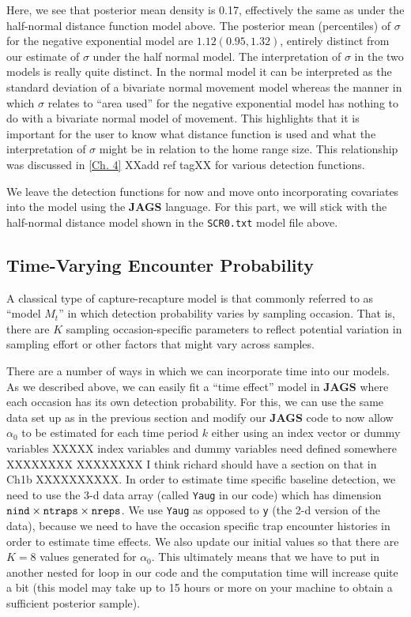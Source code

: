 Here, we see that posterior mean density is 0.17,
effectively the same as under the half-normal distance function model
above.  The posterior mean (percentiles) of $\sigma$ for the negative
exponential model are $1.12 (0.95, 1.32)$, entirely distinct from our
estimate of $\sigma$ under the half normal model. The interpretation
of $\sigma$ in the two models is really quite distinct. In the normal
model it can be interpreted as the standard deviation of a bivariate
normal movement model whereas the manner in which $\sigma$ relates to
``area used'' for the negative exponential model has nothing to do
with a bivariate normal model of movement.  This highlights that it is
important for the user to know what distance function is used and what
the interpretation of $\sigma$ might be in relation to the home range size.
This relationship was discussed in \ref{Ch. 4}
XXadd ref tagXX for various detection functions.


We leave the detection functions for now and move onto incorporating
covariates into the model using the {\bf JAGS}
language.  For this part, we will stick with the half-normal distance
model shown in the \mbox{\tt SCR0.txt} model file above.

\subsection{Time-Varying Encounter Probability}

A classical type of capture-recapture model is that commonly referred
to as ``model $M_{t}$'' \citep{otis_etal:1978} in which detection probability varies by
sampling occasion. That is, there are $K$ sampling occasion-specific
parameters to reflect potential variation in sampling effort or other
factors that might vary across samples.

There are a number of ways in which we can incorporate time into our
models.  As we described above, we can easily fit a ``time effect'' model in {\bf JAGS}
where each occasion has its own detection probability.
For this, we can use the same data set up as in the previous
section and modify our {\bf JAGS} code to now allow $\alpha_0$ to be
estimated for each time period $k$ either using an index vector or
dummy variables XXXXX index variables and dummy variables need defined
somewhere XXXXXXXX XXXXXXXX I think richard should have a section on that in Ch1b XXXXXXXXXX.  In order to estimate time
specific baseline detection, we need to use the 3-d data array (called \mbox{\tt Yaug} in our
code) which
has dimension
$\mbox{\tt nind} \times \mbox{\tt ntraps} \times \mbox{\tt nreps}$.
We use \mbox{\tt Yaug} as opposed to \mbox{\tt y} (the 2-d version of the data),
 because we need to have the occasion specific trap
encounter histories in order to estimate time effects.
We also update our
initial values so that there are $K=8$ values generated for $\alpha_0$. This
ultimately means that we have to put in another nested for loop in our
code and the computation time will increase quite a bit (this model
may take up to 15 hours or more on your machine to obtain a sufficient
posterior sample).


